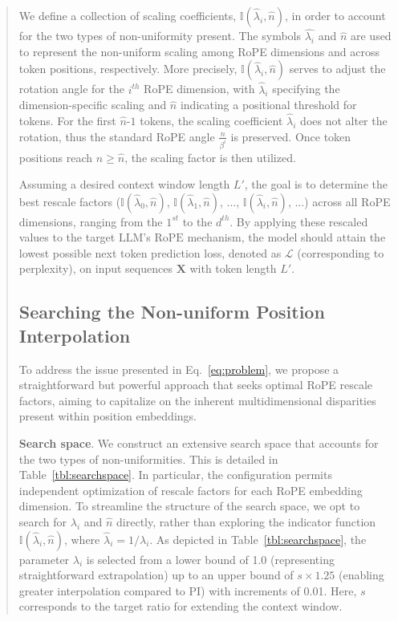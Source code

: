 \begin{abstract}
We define a collection of scaling coefficients, $\mathbb{I}(\hat{\lambda}_{i},\hat{n})$, in order to account for the two types of non-uniformity present. The symbols $\hat{\lambda_i}$ and $\hat{n}$ are used to represent the non-uniform scaling among RoPE dimensions and across token positions, respectively. More precisely, $\mathbb{I}(\hat{\lambda}_{i},\hat{n})$ serves to adjust the rotation angle for the $i^{th}$ RoPE dimension, with $\hat{\lambda}_i$ specifying the dimension-specific scaling and $\hat{n}$ indicating a positional threshold for tokens. For the first $\hat{n}$-$1$ tokens, the scaling coefficient $\hat{\lambda}_i$ does not alter the rotation, thus the standard RoPE angle $\frac{n}{\beta^i}$ is preserved. Once token positions reach $n\ge\hat{n}$, the scaling factor is then utilized.

Assuming a desired context window length $L'$, the goal is to determine the best rescale factors ($\mathbb{I}(\hat{\lambda}_{0},\hat{n})$, $\mathbb{I}(\hat{\lambda}_{1},\hat{n})$, ..., $\mathbb{I}(\hat{\lambda}_{i},\hat{n})$, ...) across all RoPE dimensions, ranging from the $1^{st}$ to the $d^{th}$. By applying these rescaled values to the target $\text{LLM}$'s $\text{RoPE}$ mechanism, the model should attain the lowest possible next token prediction loss, denoted as $\mathcal{L}$ (corresponding to perplexity), on input sequences $\mathbf{X}$ with token length $L'$.

\subsection{Searching the Non-uniform Position Interpolation}

To address the issue presented in Eq.~\ref{eq:problem}, we propose a straightforward but powerful approach that seeks optimal RoPE rescale factors, aiming to capitalize on the inherent multidimensional disparities present within position embeddings.

\textbf{Search space}. We construct an extensive search space that accounts for the two types of non-uniformities. This is detailed in Table~\ref{tbl:searchspace}. In particular, the configuration permits independent optimization of rescale factors for each RoPE embedding dimension. To streamline the structure of the search space, we opt to search for $\lambda_i$ and $\hat{n}$ directly, rather than exploring the indicator function $\mathbb{I}(\hat{\lambda}_{i},\hat{n})$, where $\hat{\lambda}_{i}=1/\lambda_i$. As depicted in Table~\ref{tbl:searchspace}, the parameter $\lambda_i$ is selected from a lower bound of 1.0 (representing straightforward extrapolation) up to an upper bound of $s\times1.25$ (enabling greater interpolation compared to PI) with increments of 0.01. Here, $s$ corresponds to the target ratio for extending the context window.


\end{abstract}
